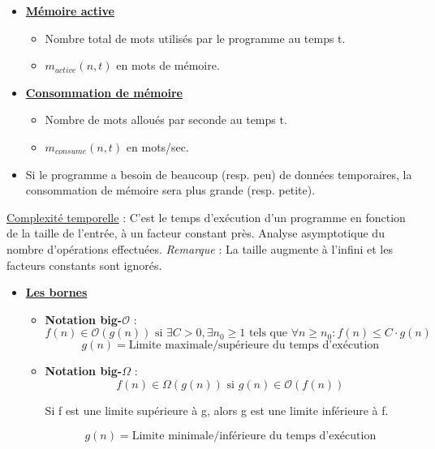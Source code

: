 \documentclass[fr,license=none]{../../../eplsummary}
\newcommand{\bigO}{\ensuremath{\mathcal{O}}}
\begin{document}
\begin{flushleft}
\begin{itemize}
\item \underline{\textbf {Mémoire active}}

\begin{itemize} [label=\textbullet, font=\MEDIUM]
\item Nombre total de mots utilisés par le programme au temps t.
\item $m_{active} (n,t)$ en mots de mémoire.
\end{itemize} \smallbreak

\item \underline{\textbf {Consommation de mémoire}}

\begin{itemize} [label=\textbullet, font=\MEDIUM]
\item Nombre de mots alloués par seconde au temps t.
\item $m_{consume} (n,t)$ en mots/sec.
\end{itemize}

\item Si le programme a besoin de beaucoup (resp. peu) de données temporaires, la consommation de mémoire sera plus grande (resp. petite).

\end{itemize} \bigbreak


\textcolor{mauvedef}{\underline{Complexité temporelle}} : C’est le temps d’exécution d’un programme en fonction de la taille de l’entrée, à un facteur constant près. Analyse asymptotique du nombre d'opérations effectuées. \textit{Remarque} : La taille augmente à l'infini et les facteurs constants sont ignorés.

\begin{itemize}
\item \underline{\textbf {Les bornes}}

\begin{itemize} [label=\textbullet, font=\MEDIUM]
\item \textbf{Notation big-$\bigO$} :
$$f(n) \in \bigO (g(n)) \text{ si } \exists C > 0, \exists n_0 \ge 1 \text{ tels que } \forall n \ge n_0 : f(n) \le C \cdot g(n)   $$
$$g(n) = \text{Limite maximale/supérieure du temps d'exécution}$$
\newpage
\item \textbf{Notation big-$\Omega$} :
$$f(n) \in \Omega (g(n)) \text{  si  } g(n) \in \bigO (f(n))$$
\begin{center} Si f est une limite supérieure à g, alors g est une limite inférieure à f. \end{center}
$$g(n) = \text{Limite minimale/inférieure du temps d'exécution}$$


\end{itemize}
\end{itemize}
\end{flushleft}
\end{document}

